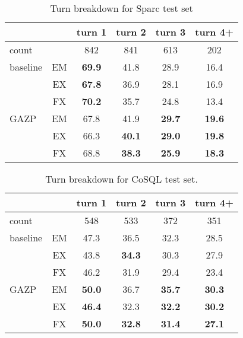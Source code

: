 \documentclass[11pt,a4paper]{article}
\begin{document}
\begin{table}[ht]
\centering
\addtolength{\tabcolsep}{-1.7pt}
\begin{tabular}{@{}lccccc@{}}
\toprule
         &    & turn 1 & turn 2 & turn 3 & turn 4+ \\ \midrule
count    &    & 842    & 841    & 613    & 202     \\ \midrule
baseline & EM & \textbf{69.9}   & 41.8   & 28.9   & 16.4    \\
         & EX & \textbf{67.8}   & 36.9   & 28.1   & 16.9    \\
         & FX & \textbf{70.2}   & 35.7   & 24.8   & 13.4    \\ \midrule
GAZP     & EM & 67.8   & 41.9   & \textbf{29.7}   & \textbf{19.6}    \\
         & EX & 66.3   & \textbf{40.1}   & \textbf{29.0}   & \textbf{19.8}    \\
         & FX & 68.8   & \textbf{38.3}   & \textbf{25.9}   & \textbf{18.3}    \\ \bottomrule
\end{tabular}
\caption{Turn breakdown for Sparc test set}
\label{tab:breakdown-sparc-turn}
\end{table}




\begin{table}[ht]
\centering
\addtolength{\tabcolsep}{-1.7pt}
\begin{tabular}{@{}lccccc@{}}
\toprule
         &    & turn 1 & turn 2 & turn 3 & turn 4+ \\ \midrule
count    &    & 548    & 533    & 372    & 351     \\ \midrule
baseline & EM & 47.3   & 36.5   & 32.3   & 28.5    \\
         & EX & 43.8   & \textbf{34.3}   & 30.3   & 27.9    \\
         & FX & 46.2   & 31.9   & 29.4   & 23.4    \\ \bottomrule
GAZP     & EM & \textbf{50.0}   & 36.7   & \textbf{35.7}   & \textbf{30.3}    \\
         & EX & \textbf{46.4}   & 32.3   & \textbf{32.2}   & \textbf{30.2}    \\
         & FX & \textbf{50.0}   & \textbf{32.8}   & \textbf{31.4}   & \textbf{27.1}    \\ \midrule
\end{tabular}
\caption{Turn breakdown for CoSQL test set.}
\label{tab:breakdown-cosql-turn}
\end{table}
\end{document}
